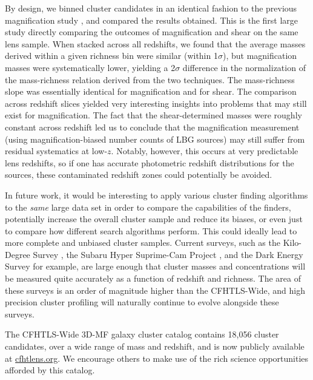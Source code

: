 By design, we binned cluster candidates in an identical fashion to the previous magnification study \citep{Ford14}, and compared the results obtained. This is the first large study directly comparing the outcomes of magnification and shear on the same lens sample. When stacked across all redshifts, we found that the average masses derived within a given richness bin were similar (within 1$\sigma$), but magnification masses were systematically lower, yielding a 2$\sigma$ difference in the normalization of the mass-richness relation derived from the two techniques. The mass-richness slope was essentially identical for magnification and for shear. The comparison across redshift slices yielded very interesting insights into problems that may still exist for magnification. The fact that the shear-determined masses were roughly constant across redshift led us to conclude that the magnification measurement (using magnification-biased number counts of \ac{LBG} sources) may still suffer from residual systematics at low-$z$. Notably, however, this occurs at very predictable lens redshifts, so if one has accurate photometric redshift distributions for the sources, these contaminated redshift zones could potentially be avoided.

In future work, it would be interesting to apply various cluster finding algorithms to the {\em same} large data set in order to compare the capabilities of the finders, potentially increase the overall cluster sample and reduce its biases, or even just to compare how different search algorithms perform.  This could ideally lead to more complete and unbiased cluster samples. Current surveys, such as the Kilo-Degree Survey \citep{KiDS13}, the Subaru Hyper Suprime-Cam Project \citep{HSC10}, and the Dark Energy Survey \citep{DES05} for example, are large enough that cluster masses and concentrations will be measured quite accurately as a function of redshift and richness. The area of these surveys is an order of magnitude higher than the \ac{CFHTLS}-Wide, and high precision cluster profiling will naturally continue to evolve alongside these surveys.

The \ac{CFHTLS}-Wide \ac{3D-MF} galaxy cluster catalog contains 18,056 cluster candidates, over a wide range of mass and redshift, and is now publicly available at \url{cfhtlens.org}. We encourage others to make use of the rich science opportunities afforded by this catalog. 










